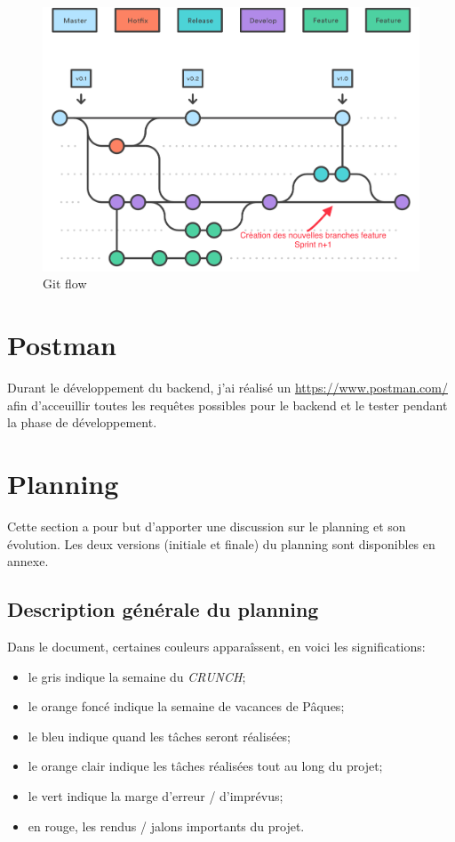 \documentclass[
    iai, %
    il, %
]{heig-tb}
\begin{document}
\begin{center}
    \begin{figure}[h]
        \includegraphics[width=\textwidth]{./assets/figures/git-flow.png}
        \caption{Git flow \label{git-flow}}
    \end{figure}
\end{center}

\section{Postman}
Durant le développement du \Gls{backend}, j'ai réalisé un \href{Postman collaboratif}{https://www.postman.com/} afin d'acceuillir toutes les requêtes possibles pour le \Gls{backend} et le tester pendant la phase de développement.



\section{Planning}
Cette section a pour but d'apporter une discussion sur le planning et son évolution.
Les deux versions (initiale et finale) du planning sont disponibles en annexe.

\subsection{Description générale du planning}

Dans le document, certaines couleurs apparaîssent, en voici les significations:
\begin{itemize}
    \item le gris indique la semaine du \emph{CRUNCH};
    \item le orange foncé indique la semaine de vacances de Pâques;
    \item le bleu indique quand les tâches seront réalisées;
    \item le orange clair indique les tâches réalisées tout au long du projet;
    \item le vert indique la marge d'erreur / d'imprévus;
    \item en rouge, les rendus / jalons importants du projet.
\end{itemize}
\end{document}
